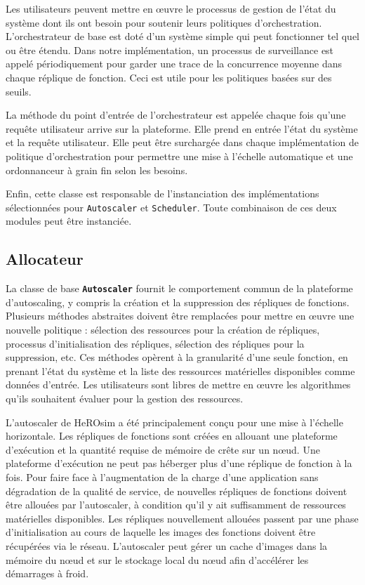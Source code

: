 Les utilisateurs peuvent mettre en œuvre le processus de gestion de l'état du système dont ils ont besoin pour soutenir leurs politiques d'orchestration. L'orchestrateur de base est doté d'un système simple qui peut fonctionner tel quel ou être étendu. Dans notre implémentation, un processus de surveillance est appelé périodiquement pour garder une trace de la concurrence moyenne dans chaque réplique de fonction. Ceci est utile pour les politiques basées sur des seuils.

La méthode du point d'entrée de l'orchestrateur est appelée chaque fois qu'une requête utilisateur arrive sur la plateforme. Elle prend en entrée l'état du système et la requête utilisateur. Elle peut être surchargée dans chaque implémentation de politique d'orchestration pour permettre une mise à l'échelle automatique et une ordonnanceur à grain fin selon les besoins.

Enfin, cette classe est responsable de l'instanciation des implémentations sélectionnées pour \texttt{Autoscaler} et \texttt{Scheduler}. Toute combinaison de ces deux modules peut être instanciée.

\subsection{Allocateur}

La classe de base \textbf{\texttt{Autoscaler}} fournit le comportement commun de la plateforme d'autoscaling, y compris la création et la suppression des répliques de fonctions. Plusieurs méthodes abstraites doivent être remplacées pour mettre en œuvre une nouvelle politique : sélection des ressources pour la création de répliques, processus d'initialisation des répliques, sélection des répliques pour la suppression, etc. Ces méthodes opèrent à la granularité d'une seule fonction, en prenant l'état du système et la liste des ressources matérielles disponibles comme données d'entrée. Les utilisateurs sont libres de mettre en œuvre les algorithmes qu'ils souhaitent évaluer pour la gestion des ressources.

L'autoscaler de HeROsim a été principalement conçu pour une mise à l'échelle horizontale. Les répliques de fonctions sont créées en allouant une plateforme d'exécution et la quantité requise de mémoire de crête sur un nœud. Une plateforme d'exécution ne peut pas héberger plus d'une réplique de fonction à la fois. Pour faire face à l'augmentation de la charge d'une application sans dégradation de la qualité de service, de nouvelles répliques de fonctions doivent être allouées par l'autoscaler, à condition qu'il y ait suffisamment de ressources matérielles disponibles. Les répliques nouvellement allouées passent par une phase d'initialisation au cours de laquelle les images des fonctions doivent être récupérées via le réseau. L'autoscaler peut gérer un cache d'images dans la mémoire du nœud et sur le stockage local du nœud afin d'accélérer les démarrages à froid.

